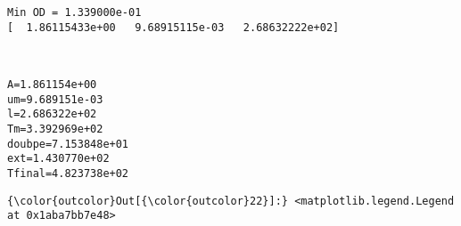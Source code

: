 \documentclass[11pt]{article}
\begin{document}
    \begin{Verbatim}[commandchars=\\\{\}]
Min OD = 1.339000e-01
[  1.86115433e+00   9.68915115e-03   2.68632222e+02]

    \end{Verbatim}

    \begin{center}
    \end{center}
    { \hspace*{\fill} \\}
    
    \begin{Verbatim}[commandchars=\\\{\}]
A=1.861154e+00
um=9.689151e-03
l=2.686322e+02
Tm=3.392969e+02
doubpe=7.153848e+01
ext=1.430770e+02
Tfinal=4.823738e+02

    \end{Verbatim}

            \begin{Verbatim}[commandchars=\\\{\}]
{\color{outcolor}Out[{\color{outcolor}22}]:} <matplotlib.legend.Legend at 0x1aba7bb7e48>
\end{Verbatim}
        
    \begin{center}
    \end{center}
    { \hspace*{\fill} \\}
    
    \begin{center}
    \end{center}
    { \hspace*{\fill} \\}
    
\end{document}
